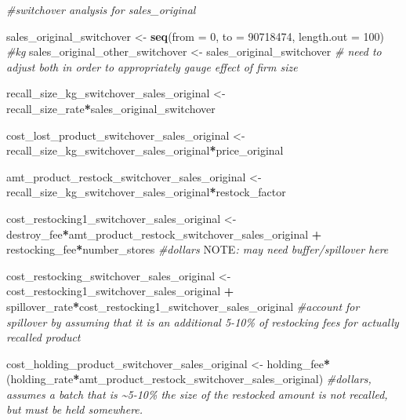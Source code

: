 \documentclass[
]{article}
\newenvironment{Shaded}{\begin{snugshade}}{\end{snugshade}}
\newcommand{\AlertTok}[1]{\textcolor[rgb]{0.94,0.16,0.16}{#1}}
\newcommand{\AttributeTok}[1]{\textcolor[rgb]{0.13,0.29,0.53}{#1}}
\newcommand{\CommentTok}[1]{\textcolor[rgb]{0.56,0.35,0.01}{\textit{#1}}}
\newcommand{\DecValTok}[1]{\textcolor[rgb]{0.00,0.00,0.81}{#1}}
\newcommand{\FunctionTok}[1]{\textcolor[rgb]{0.13,0.29,0.53}{\textbf{#1}}}
\newcommand{\NormalTok}[1]{#1}
\newcommand{\OtherTok}[1]{\textcolor[rgb]{0.56,0.35,0.01}{#1}}
\newcommand{\SpecialCharTok}[1]{\textcolor[rgb]{0.81,0.36,0.00}{\textbf{#1}}}
\begin{document}
\begin{Shaded}
\begin{Highlighting}[]
\CommentTok{\#switchover analysis for sales\_original}

\NormalTok{sales\_original\_switchover }\OtherTok{\textless{}{-}} \FunctionTok{seq}\NormalTok{(}\AttributeTok{from =} \DecValTok{0}\NormalTok{, }\AttributeTok{to =} \DecValTok{90718474}\NormalTok{, }\AttributeTok{length.out =} \DecValTok{100}\NormalTok{) }\CommentTok{\#kg}
\NormalTok{sales\_original\_other\_switchover }\OtherTok{\textless{}{-}}\NormalTok{ sales\_original\_switchover }\CommentTok{\# need to adjust both in order to appropriately gauge effect of firm size}

\NormalTok{recall\_size\_kg\_switchover\_sales\_original }\OtherTok{\textless{}{-}}\NormalTok{ recall\_size\_rate}\SpecialCharTok{*}\NormalTok{sales\_original\_switchover}

\NormalTok{cost\_lost\_product\_switchover\_sales\_original }\OtherTok{\textless{}{-}}\NormalTok{ recall\_size\_kg\_switchover\_sales\_original}\SpecialCharTok{*}\NormalTok{price\_original}

\NormalTok{amt\_product\_restock\_switchover\_sales\_original }\OtherTok{\textless{}{-}}\NormalTok{ recall\_size\_kg\_switchover\_sales\_original}\SpecialCharTok{*}\NormalTok{restock\_factor}

\NormalTok{cost\_restocking1\_switchover\_sales\_original }\OtherTok{\textless{}{-}}\NormalTok{ destroy\_fee}\SpecialCharTok{*}\NormalTok{amt\_product\_restock\_switchover\_sales\_original }\SpecialCharTok{+}\NormalTok{ restocking\_fee}\SpecialCharTok{*}\NormalTok{number\_stores  }\CommentTok{\#dollars }\AlertTok{NOTE}\CommentTok{: may need buffer/spillover here}

\NormalTok{cost\_restocking\_switchover\_sales\_original }\OtherTok{\textless{}{-}}\NormalTok{ cost\_restocking1\_switchover\_sales\_original }\SpecialCharTok{+}\NormalTok{ spillover\_rate}\SpecialCharTok{*}\NormalTok{cost\_restocking1\_switchover\_sales\_original }\CommentTok{\#account for spillover by assuming that it is an additional 5{-}10\% of restocking fees for actually recalled product}

\NormalTok{cost\_holding\_product\_switchover\_sales\_original }\OtherTok{\textless{}{-}}\NormalTok{ holding\_fee}\SpecialCharTok{*}\NormalTok{(holding\_rate}\SpecialCharTok{*}\NormalTok{amt\_product\_restock\_switchover\_sales\_original) }\CommentTok{\#dollars, assumes a batch that is \textasciitilde{}5{-}10\% the size of the restocked amount is not recalled, but must be held somewhere.}


\end{Highlighting}
\end{Shaded}
\end{document}
